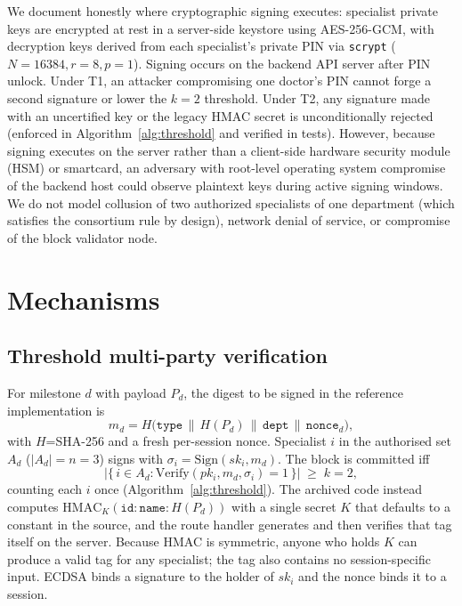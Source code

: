 \documentclass[journal]{IEEEtran}
\begin{document}
We document honestly where cryptographic signing executes: specialist private
keys are encrypted at rest in a server-side keystore using AES-256-GCM, with
decryption keys derived from each specialist's private PIN via \texttt{scrypt}
($N=16384, r=8, p=1$). Signing occurs on the backend API server after PIN
unlock. Under T1, an attacker compromising one doctor's PIN cannot forge a
second signature or lower the $k=2$ threshold. Under T2, any signature made
with an uncertified key or the legacy HMAC secret is unconditionally rejected
(enforced in Algorithm~\ref{alg:threshold} and verified in tests). However,
because signing executes on the server rather than a client-side hardware security
module (HSM) or smartcard, an adversary with root-level operating system compromise
of the backend host could observe plaintext keys during active signing windows.
We do not model collusion of two authorized specialists of one department (which
satisfies the consortium rule by design), network denial of service, or compromise
of the block validator node.

\section{Mechanisms}\label{sec:method}

\subsection{Threshold multi-party verification}
For milestone $d$ with payload $P_d$, the digest to be signed in the reference
implementation is
\begin{equation}
m_d = H\big(\texttt{type}\,\|\,H(P_d)\,\|\,\texttt{dept}\,\|\,\texttt{nonce}_d\big),
\end{equation}
with $H$=SHA-256 and a fresh per-session nonce. Specialist $i$ in the
authorised set $A_d$ ($|A_d|=n=3$) signs with $\sigma_i=\mathrm{Sign}(sk_i,m_d)$.
The block is committed iff
\begin{equation}
\big|\{\, i \in A_d : \mathrm{Verify}(pk_i,m_d,\sigma_i)=1 \,\}\big| \;\ge\; k=2,
\label{eq:threshold}
\end{equation}
counting each $i$ once (Algorithm~\ref{alg:threshold}). The archived code
instead computes $\mathrm{HMAC}_{K}(\texttt{id}\!:\!\texttt{name}\!:\!H(P_d))$
with a single secret $K$ that defaults to a constant in the source, and the
route handler generates and then verifies that tag itself on the server.
Because HMAC is symmetric, anyone who holds $K$ can produce a valid tag for
any specialist; the tag also contains no session-specific input. ECDSA
\cite{ecdsa2001} binds a signature to the holder of $sk_i$ and the nonce
binds it to a session.
\end{document}
